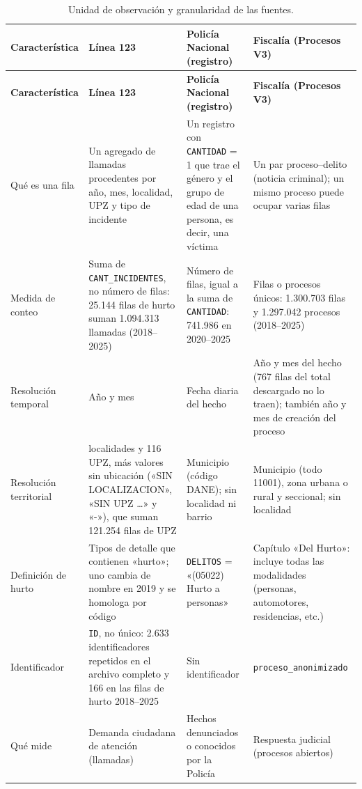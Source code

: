 {\small
\setlength{\tabcolsep}{4pt}
\begin{longtable}{@{}>{\raggedright\arraybackslash}p{2.6cm}>{\raggedright\arraybackslash}p{4.2cm}>{\raggedright\arraybackslash}p{4.0cm}>{\raggedright\arraybackslash}p{4.2cm}@{}}
\caption{Unidad de observación y granularidad de las fuentes.}\label{tab:compatibilidad}\\
\toprule
\textbf{Característica} & \textbf{Línea 123} & \textbf{Policía Nacional (registro)} & \textbf{Fiscalía (Procesos V3)} \\
\midrule
\endfirsthead
\toprule
\textbf{Característica} & \textbf{Línea 123} & \textbf{Policía Nacional (registro)} & \textbf{Fiscalía (Procesos V3)} \\
\midrule
\endhead
\bottomrule
\endfoot
Qué es una fila & Un agregado de llamadas procedentes por año, mes, localidad, UPZ y tipo de incidente & Un registro con \texttt{CANTIDAD} = 1 que trae el género y el grupo de edad de una persona, es decir, una víctima & Un par proceso--delito (noticia criminal); un mismo proceso puede ocupar varias filas \\
\addlinespace
Medida de conteo & Suma de \texttt{CANT\_INCIDENTES}, no número de filas: 25.144 filas de hurto suman 1.094.313 llamadas (2018--2025) & Número de filas, igual a la suma de \texttt{CANTIDAD}: 741.986 en 2020--2025 & Filas o procesos únicos: 1.300.703 filas y 1.297.042 procesos (2018--2025) \\
\addlinespace
Resolución temporal & Año y mes & Fecha diaria del hecho & Año y mes del hecho (767 filas del total descargado no lo traen); también año y mes de creación del proceso \\
\addlinespace
Resolución territorial & 20 localidades y 116 UPZ, más valores sin ubicación («SIN LOCALIZACION», «SIN UPZ \ldots» y «-»), que suman 121.254 filas de UPZ & Municipio (código DANE); sin localidad ni barrio & Municipio (todo 11001), zona urbana o rural y seccional; sin localidad \\
\addlinespace
Definición de hurto & Tipos de detalle que contienen «hurto»; uno cambia de nombre en 2019 y se homologa por código & \texttt{DELITOS} = «(05022) Hurto a personas» & Capítulo «Del Hurto»: incluye todas las modalidades (personas, automotores, residencias, etc.) \\
\addlinespace
Identificador & \texttt{ID}, no único: 2.633 identificadores repetidos en el archivo completo y 166 en las filas de hurto 2018--2025 & Sin identificador & \texttt{proceso\_anonimizado} \\
\addlinespace
Qué mide & Demanda ciudadana de atención (llamadas) & Hechos denunciados o conocidos por la Policía & Respuesta judicial (procesos abiertos) \\
\end{longtable}
}

